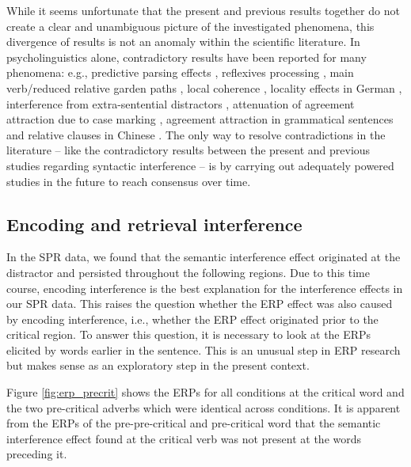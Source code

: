 \documentclass[review,preprint,12pt,authoryear,floatsintext]{elsarticle}
\begin{document}
{{{While it seems unfortunate that the present and previous results together do not create a clear and unambiguous picture of the investigated phenomena, this divergence of results is not an anomaly within the scientific literature. In psycholinguistics alone, contradictory results have been reported for many phenomena: e.g., predictive parsing effects \citep{nieuwland_etal_2018, Delong_etal_2005}, reflexives processing \citep{jaeger_etal_2020, dillon2013}, main verb/reduced relative garden paths \citep{trueswell1994semantic, ferreira1986independence}, local coherence \citep{taboretal04, lcpaape2025}, locality effects in German \citep{levy&keller_2013, vasishth2018_signficancefilter}, interference from extra-sentential distractors \citep{vandyke_mcelree06, mertzen_repVDM2006}, attenuation of agreement attraction due to case marking \citep{hartsuiker2001_agree, Avetisyan_etal_2020_agree}, agreement attraction in grammatical sentences \citep{wagers2009agrttr, nicenboim} and relative clauses in Chinese \citep{hsiao03, gibsonwu, VasishthetalPLoSOne2013, jaeger2015subject}. The only way to resolve contradictions in the literature -- like the contradictory results between the present and previous studies regarding syntactic interference -- is by carrying out adequately powered studies in the future to reach consensus over time.}\label{not_an_anomaly}

\subsection*{Encoding and retrieval interference}
In the SPR data, we found that the semantic interference effect originated at the distractor and persisted throughout the following regions. Due to this time course, encoding interference \citep{Yadavetal2022,hammerly2019grammaticality} is the best explanation for the interference effects in our SPR data. This raises the question whether the ERP effect was also caused by encoding interference, i.e., whether the ERP effect originated prior to the critical region. To answer this question, it is necessary to look at the ERPs elicited by words earlier in the sentence. This is an unusual step in ERP research but makes sense as an exploratory step in the present context. 

Figure \ref{fig:erp_precrit} shows the ERPs for all conditions at the critical word and the two pre-critical adverbs which were identical across conditions. It is apparent from the ERPs of the pre-pre-critical and pre-critical word that the semantic interference effect found at the critical verb was not present at the words preceding it. 

}}
\end{document}

